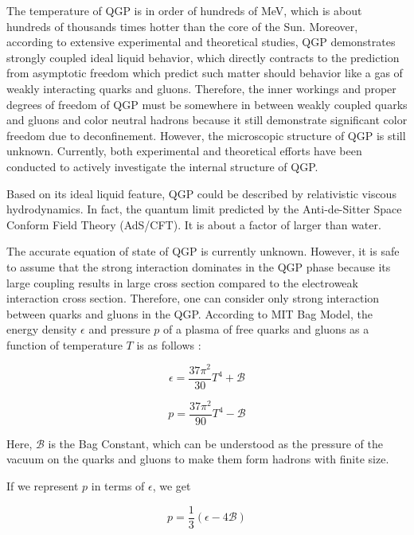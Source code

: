 The temperature of QGP is in order of hundreds of MeV, which is about hundreds of thousands times hotter than the core of the Sun. Moreover, according to extensive experimental and theoretical studies, QGP demonstrates strongly coupled ideal liquid behavior, which directly contracts to the prediction from asymptotic freedom which predict such matter should behavior like a gas of weakly interacting quarks and gluons. Therefore, the inner workings and proper degrees of freedom of QGP must be somewhere in between weakly coupled quarks and gluons and color neutral hadrons because it still demonstrate significant color freedom due to deconfinement. However, the microscopic structure of QGP is still unknown. Currently, both experimental and theoretical efforts have been conducted to actively investigate the internal structure of QGP.

Based on its ideal liquid feature, QGP could be described by relativistic viscous hydrodynamics. In fact, the quantum limit predicted by the Anti-de-Sitter Space Conform Field Theory (AdS/CFT). It is about a factor of larger than water.

The accurate equation of state of QGP is currently unknown. However, it is safe to assume that the strong interaction dominates in the QGP phase because its large coupling results in large cross section compared to the electroweak interaction cross section. Therefore, one can consider only strong interaction between quarks and gluons in the QGP. According to MIT Bag Model, the energy density $\epsilon$ and pressure $p$ of a plasma of free quarks and gluons as a function of temperature $T$ is as follows \cite{MITBag}:

\begin{equation}
\epsilon = \frac{37 \pi^2}{30} T^4 + \mathcal{B}
\end{equation}

\begin{equation}
p = \frac{37 \pi^2}{90} T^4 - \mathcal{B}
\end{equation}

Here, $\mathcal{B}$ is the Bag Constant, which can be understood as the pressure of the vacuum on the quarks and gluons to make them form hadrons with finite size.

If we represent $p$ in terms of $\epsilon$, we get

\begin{equation}
p = \frac{1}{3} (\epsilon - 4\mathcal{B})
\end{equation}

